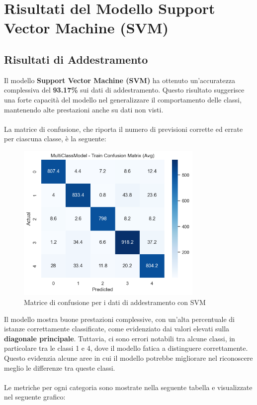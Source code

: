 \section{Risultati del Modello Support Vector Machine (SVM)}

\subsection{Risultati di Addestramento}

Il modello \textbf{Support Vector Machine (SVM)} ha ottenuto un'accuratezza complessiva del \textbf{93.17\%} sui dati di addestramento. Questo risultato suggerisce una forte capacità del modello nel generalizzare il comportamento delle classi, mantenendo alte prestazioni anche su dati non visti. \\ \\
La matrice di confusione, che riporta il numero di previsioni corrette ed errate per ciascuna classe, è la seguente:

\begin{figure}[H]
    \centering
    \includegraphics[width=0.8\textwidth]{images/confusion_matrix_train_svm.png}
    \caption{Matrice di confusione per i dati di addestramento con SVM}
    \label{fig:confusion_matrix_train_svm}
\end{figure}

Il modello mostra buone prestazioni complessive, con un’alta percentuale di istanze correttamente classificate, come evidenziato dai valori elevati sulla \textbf{diagonale principale}. Tuttavia, ci sono errori notabili tra alcune classi, in particolare tra le classi 1 e 4, dove il modello fatica a distinguere correttamente. Questo evidenzia alcune aree in cui il modello potrebbe migliorare nel riconoscere meglio le differenze tra queste classi.  \\ \\
Le metriche per ogni categoria sono mostrate nella seguente tabella e visualizzate nel seguente grafico:

